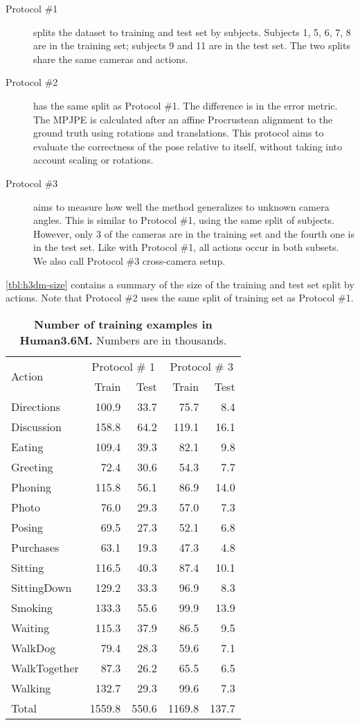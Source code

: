 \documentclass[preprint]{elsarticle}
\begin{document}
\begin{description}
\item[Protocol \#1] splits the dataset to training and test set by subjects. Subjects 1, 5, 6, 7, 8 are in the training set; subjects 9 and 11 are in the test set. The two splits share the same cameras and actions.

\item[Protocol \#2] has the same split as Protocol \#1. The difference is in the error metric. The MPJPE is calculated after an affine Procrustean alignment to the ground truth using rotations and translations. This protocol aims to evaluate the correctness of the pose relative to itself, without taking into account scaling or rotations.

\item[Protocol \#3] aims to measure how well the method generalizes to unknown camera angles. This is similar to Protocol \#1, using the same split of subjects. However, only 3 of the cameras are in the training set and the fourth one is in the test set. Like with Protocol \#1, all actions occur in both subsets. We also call Protocol \#3 cross-camera setup.
\end{description}

\autoref{tbl:h3dm-size} contains a summary of the size of the training and test set split by actions. Note that Protocol \#2 uses the same split of training set as Protocol \#1.

\begin{table}[h]
\centering
\begin{tabular}{l|rr|rr}
\multirow{2}{2.2cm}{Action} & \multicolumn{2}{c|}{Protocol \# 1} & \multicolumn{2}{c}{Protocol \# 3} \\
 & Train & Test & Train & Test \\
\hline
Directions & 100.9 & 33.7 & 75.7 & 8.4 \\
Discussion & 158.8 & 64.2 & 119.1 & 16.1 \\
Eating & 109.4 & 39.3 & 82.1 & 9.8 \\
Greeting & 72.4 & 30.6 & 54.3 & 7.7 \\
Phoning & 115.8 & 56.1 & 86.9 & 14.0 \\
Photo & 76.0 & 29.3 & 57.0 & 7.3 \\
Posing & 69.5 & 27.3 & 52.1 & 6.8 \\
Purchases & 63.1 & 19.3 & 47.3 & 4.8 \\
Sitting & 116.5 & 40.3 & 87.4 & 10.1 \\
SittingDown & 129.2 & 33.3 & 96.9 & 8.3 \\
Smoking & 133.3 & 55.6 & 99.9 & 13.9 \\
Waiting & 115.3 & 37.9 & 86.5 & 9.5 \\
WalkDog & 79.4 & 28.3 & 59.6 & 7.1 \\
WalkTogether & 87.3 & 26.2 & 65.5 & 6.5 \\
Walking & 132.7 & 29.3 & 99.6 & 7.3 \\
\hline
Total & 1559.8 & 550.6 & 1169.8 & 137.7
\end{tabular}
\caption{\textbf{Number of training examples in Human3.6M.} Numbers are in thousands.}
\label{tbl:h3dm-size}
\end{table}
\end{document}
